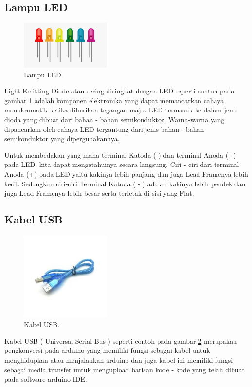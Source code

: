 \subsection{Lampu LED}
\begin{figure}[ht]
\centerline{\includegraphics[width=0.4\textwidth]{figures/led.jpg}}
\caption{Lampu LED.}
\label{led}
\end{figure}
Light Emitting Diode atau sering disingkat dengan LED seperti contoh pada gambar \ref{led} adalah komponen elektronika yang dapat memancarkan  cahaya monokromatik ketika diberikan tegangan maju. LED termasuk ke dalam jenis dioda yang dibuat dari bahan - bahan semikonduktor. Warna-warna yang dipancarkan oleh cahaya LED tergantung dari jenis bahan - bahan semikonduktor yang dipergunakannya.





Untuk membedakan yang mana terminal Katoda (-) dan terminal Anoda (+) pada LED, kita dapat mengetahuinya secara langsung. Ciri - ciri dari terminal Anoda (+) pada LED yaitu kakinya lebih panjang dan juga Lead Framenya lebih kecil. Sedangkan ciri-ciri Terminal Katoda ( - ) adalah kakinya lebih pendek dan juga Lead Framenya lebih besar serta terletak di sisi yang Flat.
\subsection{Kabel USB}
\begin{figure}[ht]
\centerline{\includegraphics[width=0.4\textwidth]{figures/usb.jpg}}
\caption{Kabel USB.}
\label{usb}
\end{figure}
Kabel USB ( Universal Serial Bus ) seperti contoh pada gambar \ref{usb} merupakan pengkonversi pada arduino yang memiliki fungsi sebagai kabel untuk menghidupkan atau menjalankan arduino dan juga kabel ini memiliki fungsi sebagai media transfer untuk mengupload barisan kode - kode yang telah dibuat pada software arduino IDE.

